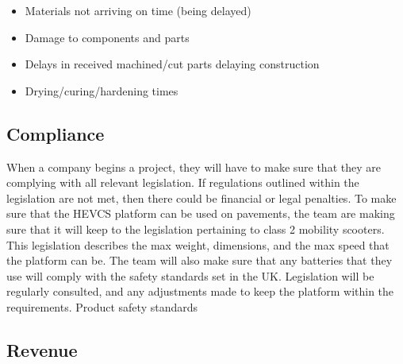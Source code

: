 \documentclass [12pt]{article}
\begin{document}
\begin{itemize}
    \item Materials not arriving on time (being delayed)
    \item Damage to components and parts
    \item Delays in received machined/cut parts delaying construction
    \item Drying/curing/hardening times
\end{itemize}

\subsection{Compliance}\label{sec:Compliance_Risk}

When a company begins a project, they will have to make sure that they are complying with all relevant legislation. If regulations outlined within the legislation are not met, then there could be financial or legal penalties. To make sure that the HEVCS platform can be used on pavements, the team are making sure that it will keep to the legislation pertaining to class 2 mobility scooters. This legislation describes the max weight, dimensions, and the max speed that the platform can be. The team will also make sure that any batteries that they use will comply with the safety standards set in the UK. Legislation will be regularly consulted, and any adjustments made to keep the platform within the requirements. Product safety standards

\subsection{Revenue}\label{sec:Revenue_Risk}
\end{document}
